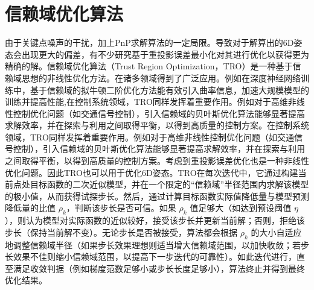 \section{信赖域优化算法}

由于关键点噪声的干扰，加上PnP求解算法的一定局限。导致对于解算出的6D姿态会出现更大的偏差，有不少研究基于重投影误差最小化对其进行优化以获得更为精确的解\cite{10297555,guo2024joint}。信赖域优化算法（Trust Region Optimization，TRO）是一种基于信赖域思想的非线性优化方法。在诸多领域得到了广泛应用。例如在深度神经网络训练中，基于信赖域的拟牛顿二阶优化方法能有效引入曲率信息，加速大规模模型的训练并提高性能​\cite{a16100490},在控制系统领域，TRO同样发挥着重要作用。例如对于高维非线性控制优化问题（如交通信号控制），引入信赖域的贝叶斯优化算法能够显著提高求解效率，并在探索与利用之间取得平衡，以得到高质量的控制方案​\cite{gong2024optimizing}
。在控制系统领域，TRO同样发挥着重要作用。例如对于高维非线性控制优化问题（如交通信号控制），引入信赖域的贝叶斯优化算法能够显著提高求解效率，并在探索与利用之间取得平衡，以得到高质量的控制方案​\cite{2024_Gong}。考虑到重投影误差优化也是一种非线性优化问题。因此TRO也可以用于优化6D姿态。TRO在每次迭代中，它通过构建当前点处目标函数的二次近似模型，并在一个限定的“信赖域”半径范围内求解该模型的极小值，从而获得试探步长。然后，通过计算目标函数实际值降低量与模型预测降低量的比值 $\rho_k$，判断该步长是否可信。如果 $\rho_k$ 值足够大（如达到预设阈值 $\eta$），则认为模型对实际函数的近似较好，接受该步长并更新当前解；否则，拒绝该步长（保持当前解不变）。无论步长是否被接受，算法都会根据 $\rho_k$ 的大小自适应地调整信赖域半径（如果步长效果理想则适当增大信赖域范围，以加快收敛；若步长效果不佳则缩小信赖域范围，以提高下一步迭代的可靠性）。如此迭代进行，直至满足收敛判据（例如梯度范数足够小或步长长度足够小），算法终止并得到最终优化结果。


